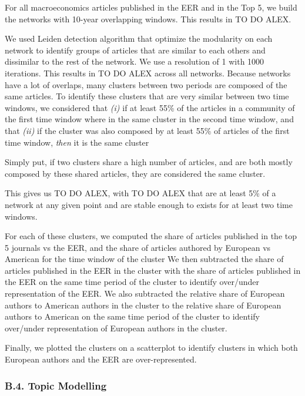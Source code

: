 \documentclass[]{elsarticle} %
\begin{document}
For all macroeconomics articles published in the EER and in the Top 5,
we build the networks with 10-year overlapping windows. This results in
TO DO ALEX.

We used Leiden detection algorithm \citep{traag2019} that optimize the
modularity on each network to identify groups of articles that are
similar to each others and dissimilar to the rest of the network. We use
a resolution of 1 with 1000 iterations. This results in TO DO ALEX
across all networks. Because networks have a lot of overlaps, many
clusters between two periods are composed of the same articles. To
identify these clusters that are very similar between two time windows,
we considered that \emph{(i)} if at least 55\% of the articles in a
community of the first time window where in the same cluster in the
second time window, and that \emph{(ii)} if the cluster was also
composed by at least 55\% of articles of the first time window,
\emph{then} it is the same cluster

Simply put, if two clusters share a high number of articles, and are
both mostly composed by these shared articles, they are considered the
same cluster.

This gives us TO DO ALEX, with TO DO ALEX that are at least 5\% of a
network at any given point and are stable enough to exists for at least
two time windows.

For each of these clusters, we computed the share of articles published
in the top 5 journals vs the EER, and the share of articles authored by
European vs American for the time window of the cluster We then
subtracted the share of articles published in the EER in the cluster
with the share of articles published in the EER on the same time period
of the cluster to identify over/under representation of the EER. We also
subtracted the relative share of European authors to American authors in
the cluster to the relative share of European authors to American on the
same time period of the cluster to identify over/under representation of
European authors in the cluster.

Finally, we plotted the clusters on a scatterplot to identify clusters
in which both European authors and the EER are over-represented.

\hypertarget{topic}{%
\subsubsection*{B.4. Topic Modelling}\label{topic}}
\end{document}
